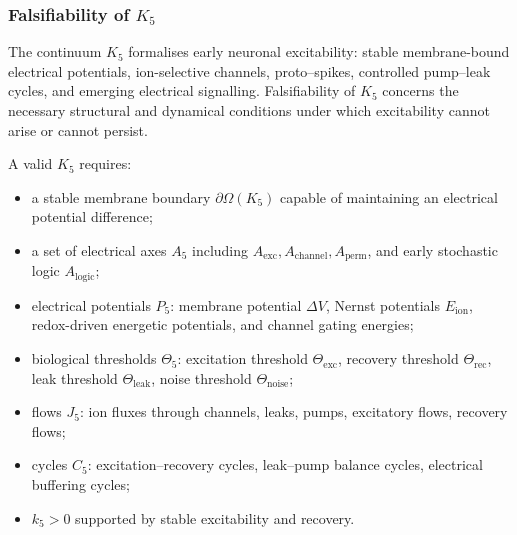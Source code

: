 
\subsubsection{Falsifiability of \texorpdfstring{$K_5$}{K_5}}
\label{sec:falsifiability-k5}

The continuum $K_5$ formalises early neuronal excitability:
stable membrane-bound electrical potentials, ion-selective channels,
proto–spikes, controlled pump–leak cycles, and emerging electrical
signalling.  
Falsifiability of $K_5$ concerns the necessary structural and dynamical
conditions under which excitability cannot arise or cannot persist.

A valid $K_5$ requires:

\begin{itemize}
    \item a stable membrane boundary $\partial\Omega(K_5)$ capable
          of maintaining an electrical potential difference;
    \item a set of electrical axes $A_5$ including 
          $A_{\mathrm{exc}}, A_{\mathrm{channel}}, A_{\mathrm{perm}}$,
          and early stochastic logic $A_{\mathrm{logic}}$;
    \item electrical potentials $P_5$:
          membrane potential $\Delta V$, Nernst potentials $E_{\mathrm{ion}}$,
          redox-driven energetic potentials, and channel gating energies;
    \item biological thresholds $\Theta_5$:
          excitation threshold $\Theta_{\mathrm{exc}}$,
          recovery threshold $\Theta_{\mathrm{rec}}$,
          leak threshold $\Theta_{\mathrm{leak}}$,
          noise threshold $\Theta_{\mathrm{noise}}$;
    \item flows $J_5$: ion fluxes through channels, leaks,
          pumps, excitatory flows, recovery flows;
    \item cycles $C_5$: excitation–recovery cycles,
          leak–pump balance cycles, electrical buffering cycles;
    \item $k_5>0$ supported by stable excitability and recovery.
\end{itemize}

